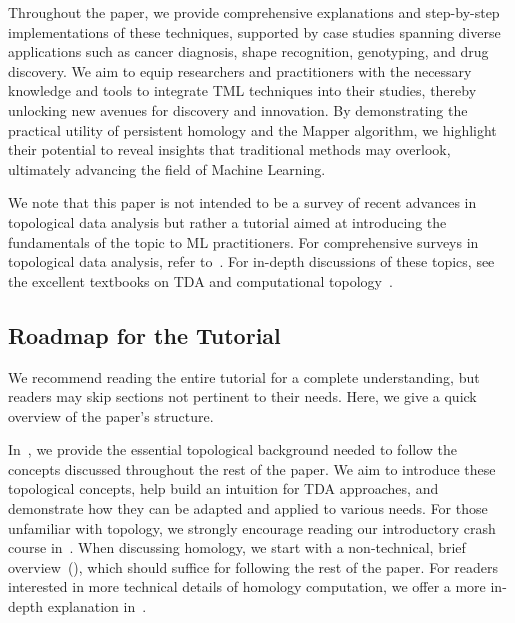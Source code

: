 Throughout the paper, we provide comprehensive explanations and step-by-step implementations of these techniques, supported by case studies spanning diverse applications such as cancer diagnosis, shape recognition, genotyping, and drug discovery. We aim to equip researchers and practitioners with the necessary knowledge and tools to integrate TML techniques into their studies, thereby unlocking new avenues for discovery and innovation. By demonstrating the practical utility of persistent homology and the Mapper algorithm, we highlight their potential to reveal insights that traditional methods may overlook, ultimately advancing the field of Machine Learning. 

We note that this paper is not intended to be a survey of recent advances in topological data analysis but rather a tutorial aimed at introducing the fundamentals of the topic to ML practitioners. For comprehensive surveys in topological data analysis, refer to~\cite{hensel2021survey,pun2022persistent,chazal2021introduction,skaf2022topological}. For in-depth discussions of these topics, see the excellent textbooks on TDA and computational topology~\cite{dey2022computational,edelsbrunner2022computational}.

\subsection{Roadmap for the Tutorial}
  

We recommend reading the entire tutorial for a complete understanding, but readers may skip sections not pertinent to their needs. Here, we give a quick overview of the paper's structure.

In~, we provide the essential topological background needed to follow the concepts discussed throughout the rest of the paper. We aim to introduce these topological concepts, help build an intuition for TDA approaches, and demonstrate how they can be adapted and applied to various needs. For those unfamiliar with topology, we strongly encourage reading our introductory crash course in~. When discussing homology, we start with a non-technical, brief overview~(), which should suffice for following the rest of the paper. For readers interested in more technical details of homology computation, we offer a more in-depth explanation in~.

 

